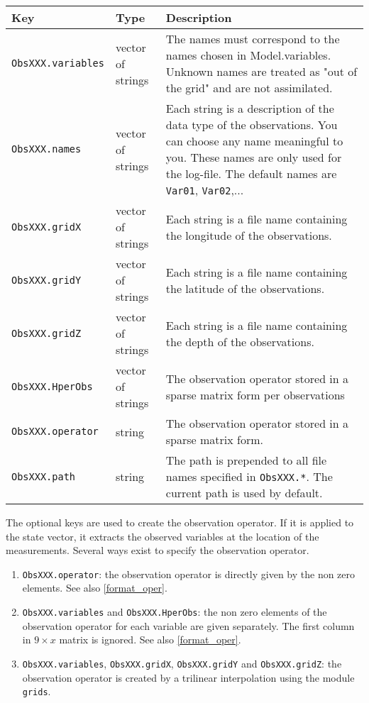 \documentclass[a4paper,12pt]{article}
\newcommand{\code}{\texttt}
\newenvironment{keytabular}{\begin{tabular}{|p{0.3\textwidth}|p{0.2\textwidth}|p{0.5\textwidth}|} \hline Key & Type & Description \\ \hline \hline }{\end{tabular}}
\begin{document}
\begin{keytabular}
\code{ObsXXX.variables} & vector of strings & The names must correspond to the names 
  chosen in Model.variables. Unknown names are treated as "out of the grid"
  and are not assimilated.
\\
\code{ObsXXX.names} & vector of strings & Each string is a description of 
the data type of the observations. You can choose any name meaningful 
to you. These names are only used for the log-file. The default names 
are \code{Var01}, \code{Var02},...
\\
\code{ObsXXX.gridX} & vector of strings & Each string is a file name containing 
  the longitude of the observations.
\\
\code{ObsXXX.gridY} & vector of strings & Each string is a file name containing 
  the latitude of the observations.
\\
\code{ObsXXX.gridZ} & vector of strings & Each string is a file name containing 
  the depth of the observations.
\\
\code{ObsXXX.HperObs} & vector of strings & The observation operator stored in a 
   sparse matrix form per observations
\\
\code{ObsXXX.operator} & string & The observation operator stored in a 
   sparse matrix form.   
\\
\code{ObsXXX.path} & string & The path is prepended to all file names
specified in \code{ObsXXX.*}. The current path is used by default.
\\
\hline
\end{keytabular}

The optional keys are used to create the observation operator. If it
is applied to the state vector, it extracts the observed variables at
the location of the measurements. Several ways exist to specify the
observation operator.

\begin{enumerate}
\item \code{ObsXXX.operator}: the observation operator is directly
  given by the non zero elements.  See
  also \ref{format_oper}. 
\item \code{ObsXXX.variables} and \code{ObsXXX.HperObs}: the non zero
  elements of the observation operator for each variable are given
  separately. The first column in $9 \times x$ matrix is ignored. See
  also \ref{format_oper}. 
\item \code{ObsXXX.variables}, \code{ObsXXX.gridX},
  \code{ObsXXX.gridY} and \code{ObsXXX.gridZ}: the observation
  operator is created by a trilinear interpolation using the module \code{grids}. 
\end{enumerate}   
\end{document}
